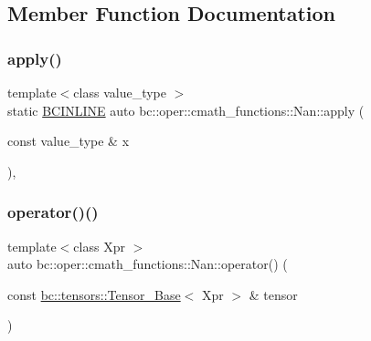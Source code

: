 \subsection{Member Function Documentation}
\mbox{\label{structbc_1_1oper_1_1cmath__functions_1_1Nan_a4bf94c55b7a6b3a77b5d08d5abee00b1}} 
\subsubsection{\texorpdfstring{apply()}{apply()}}
{\footnotesize\ttfamily template$<$class value\+\_\+type $>$ \\
static \hyperlink{common_8h_a6699e8b0449da5c0fafb878e59c1d4b1}{B\+C\+I\+N\+L\+I\+NE} auto bc\+::oper\+::cmath\+\_\+functions\+::\+Nan\+::apply (\begin{DoxyParamCaption}\item[{const value\+\_\+type \&}]{x }\end{DoxyParamCaption})\hspace{0.3cm}{\ttfamily [inline]}, {\ttfamily [static]}}

\mbox{\label{structbc_1_1oper_1_1cmath__functions_1_1Nan_af685e0d0bbc39677f193ed9b6dda10db}} 
\subsubsection{\texorpdfstring{operator()()}{operator()()}\hspace{0.1cm}{\footnotesize\ttfamily [1/3]}}
{\footnotesize\ttfamily template$<$class Xpr $>$ \\
auto bc\+::oper\+::cmath\+\_\+functions\+::\+Nan\+::operator() (\begin{DoxyParamCaption}\item[{const \hyperlink{classbc_1_1tensors_1_1Tensor__Base}{bc\+::tensors\+::\+Tensor\+\_\+\+Base}$<$ Xpr $>$ \&}]{tensor }\end{DoxyParamCaption})\hspace{0.3cm}{\ttfamily [inline]}}

